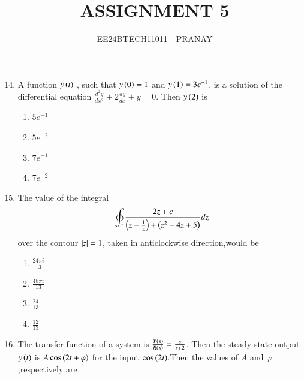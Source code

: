 \documentclass[journal,12pt,onecolumn]{IEEEtran}
\theoremstyle{remark}
\begin{document}

\vspace{3cm}

\title{ASSIGNMENT 5}
\author{EE24BTECH11011 - PRANAY}
\maketitle

\bigskip

\renewcommand{\thefigure}{\theenumi}
\renewcommand{\thetable}{\theenumi}
   \begin{enumerate}\setcounter{enumi}{13}
   \item A function $y\left(t\right)$ , such that $y\left(0\right)=1$ and $y\left(1\right) = 3e^{-1}$, is a solution of the differential equation $\frac{d^2 y}{dx^2} + 2\frac{dy}{dx}+y =0$. Then $y\left(2\right)$ is
   \begin{multicols}{4}
       \begin{enumerate}
           \item $5e^{-1}$
           \item $5e^{-2}$
           \item $7e^{-1}$
           \item $7e^{-2}$
       \end{enumerate}
   \end{multicols}
   \item The value of the integral
   \begin{align}
       \oint_c \frac{2z+c}{\left(z - \frac{1}{z}\right)+\left(z^2 - 4z + 5\right)} dz
   \end{align}
   over the contour $\left\vert z\right\vert = 1$, taken in anticlockwise direction,would be
   \begin{multicols}{4}
       \begin{enumerate}
           \item $\frac{24 \pi i}{13}$
           \item $\frac{48 \pi i}{13}$
           \item $\frac{24 }{13}$
           \item $\frac{12}{13}$
       \end{enumerate}
   \end{multicols}
   \item The transfer function of a system is $\frac{Y\left(s\right)}{R\left(s\right)} = \frac{s}{s+2}$. Then the steady state output $y\left(t\right)$ is $A\cos{\ensuremath{\left(2t + \varphi\right)}}$ for the input $\cos{\ensuremath{\left(2t\right)}}$.Then the values of $A$ and $\varphi$ ,respectively are
   \begin{multicols}{4}

\end{multicols}
\end{enumerate}
\end{document}
